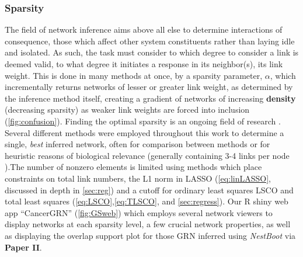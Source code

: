 \subsubsection{Sparsity}
\label{sec:spar}
The field of network inference aims above all else to determine interactions of consequence, those which affect other system constituents rather than laying idle and isolated. As such, the task must consider to which degree to consider a link is deemed valid, to what degree it initiates a response in its neighbor(s), \ie its link weight. This is done in many methods at once, by a sparsity parameter, $\alpha$, which incrementally returns networks of lesser or greater link weight, as determined by the inference method itself, creating a gradient of networks of increasing \textbf{density} (decreasing sparsity) as weaker link weights are forced into inclusion (\cref{fig:confusion}). Finding the optimal sparsity is an ongoing field of research \citep{tjarnberg2013optimal}. Several different methods were employed throughout this work to determine a single, \emph{best} inferred network, often for comparison between methods or for heuristic reasons of biological relevance (\ie generally containing 3-4 links per node \citep{tjarnberg2013optimal}).The number of nonzero elements is limited using methods which place constraints on total link numbers, \eg the L1 norm in LASSO (\cref{eq:linLASSO}, discussed in depth in \cref{sec:reg}) and a cutoff for ordinary least squares LSCO and total least squares (\cref{eq:LSCO},\cref{eq:TLSCO}, and \cref{sec:regress}). Our R shiny web app ``CancerGRN'' (\cref{fig:GSweb}) which employs several network viewers to display networks at each sparsity level, a few crucial network properties, as well as displaying the overlap support plot for those GRN inferred using \emph{NestBoot} via \textbf{Paper II}.


